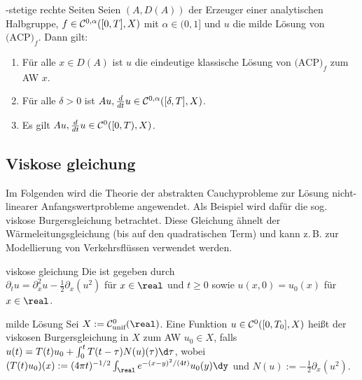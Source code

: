 \begin{Satz}{-stetige rechte Seiten}
    Seien $(A, D(A))$ der Erzeuger einer analytischen Halbgruppe,
    $f \in \mathcal{C}^{0,\alpha}([0, T], X)$ mit $\alpha \in (0, 1]$
    und $u$ die milde Lösung von $\text{(ACP)}_f$.
    Dann gilt:
    \begin{enumerate}
        \item
        Für alle $x \in D(A)$ ist $u$ die eindeutige klassische Lösung von $\text{(ACP)}_f$
        zum AW $x$.

        \item
        Für alle $\delta > 0$ ist $Au, \frac{d}{dt} u \in \mathcal{C}^{0,\alpha}([\delta, T], X)$.

        \item
        Es gilt $Au, \frac{d}{dt} u \in \mathcal{C}^0([0, T), X)$.
    \end{enumerate}
\end{Satz}

\pagebreak

\subsection{%
    Viskose gleichung%
}

\begin{Bem}
    Im Folgenden wird die Theorie der abstrakten Cauchyprobleme zur Lösung nicht-linearer
    Anfangswertprobleme angewendet.
    Als Beispiel wird dafür die sog. viskose Burgersgleichung betrachtet.
    Diese Gleichung ähnelt der Wärmeleitungsgleichung (bis auf den quadratischen Term) und
    kann z.\,B. zur Modellierung von Verkehrsflüssen verwendet werden.
\end{Bem}

\begin{Def}{viskose gleichung}
    Die  ist gegeben durch\\
    $\partial_t u = \partial_x^2 u - \frac{1}{2} \partial_x (u^2)$ für $x \in \real$ und $t \ge 0$
    sowie $u(x, 0) = u_0(x)$ für $x \in \real$.
\end{Def}

\begin{Def}{milde Lösung}
    Sei $X := \C^0_\unif(\real)$.
    Eine Funktion $u \in \mathcal{C}^0([0, T_0], X)$ heißt
     der viskosen Burgersgleichung in $X$ zum AW $u_0 \in X$,
    falls
    $u(t) = T(t)u_0 + \int_0^t T(t - \tau) N(u)(\tau) \d\tau$,
    wobei $(T(t)u_0)(x) := (4\pi t)^{-1/2} \int_\real e^{-(x-y)^2/(4t)} u_0(y)\dy$ und
    $N(u) := -\frac{1}{2} \partial_x (u^2)$.
\end{Def}

